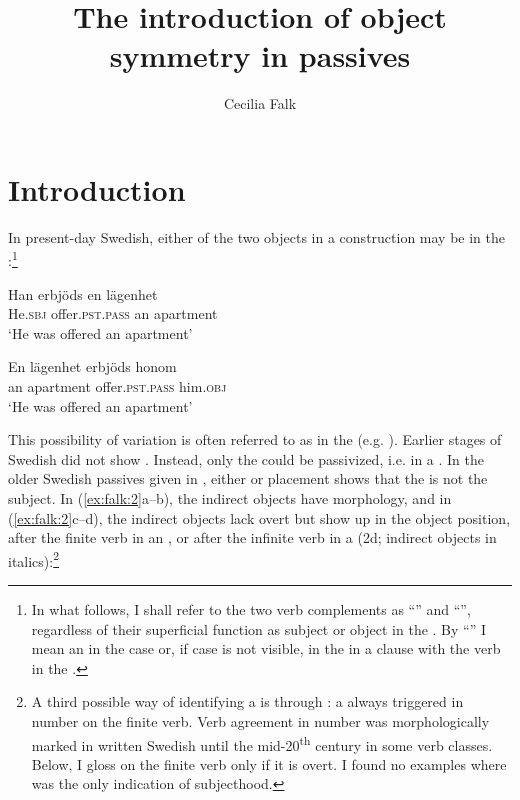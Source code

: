 \documentclass[output=paper]{langscibook}
\author{Cecilia Falk\affiliation{Stockholm University}}
\title{The introduction of object symmetry in passives}
\begin{document}
\maketitle


\section{Introduction}


In present-day Swedish, either of the two objects in a  construction may be  in the :\footnote{In what follows, I shall refer to the two verb complements as “” and “”, regardless of their superficial function as subject or object in the . By “” I mean an  in the  case or, if case is not visible, in the  in a clause with the verb in the .}

\ea%
    \label{ex:falk:1}
\ea
\gll Han    erbjöds      en  lägenhet\\
      He.\textsc{sbj}  offer.\textsc{pst}.\textsc{pass}  an  apartment\\
\glt ‘He was offered an apartment’

\ex
\gll En    lägenhet      erbjöds      honom\\
      an    apartment    offer.\textsc{pst}.\textsc{pass} him.\textsc{obj}\\
\glt ‘He was offered an apartment’
\z
\z


This possibility of variation is often referred to as  in the  (e.g. \citealt{Anagnostopoulou2003}). Earlier stages of Swedish did not show . Instead, only the  could be passivized, i.e.  in a . In the older Swedish passives given in , either  or placement shows that the  is not the subject. In (\ref{ex:falk:2}a–b), the indirect objects have  morphology, and in (\ref{ex:falk:2}c–d), the indirect objects lack overt  but show up in the object position, after the finite verb in an  , or after the infinite verb in a  (2d; indirect objects in italics):\footnote{A third possible way of identifying a  is through : a  always triggered  in number on the finite verb. Verb agreement in number was morphologically marked in written Swedish until the mid-20\textsuperscript{th} century in some verb classes. Below, I gloss  on the finite verb only if it is overt. I found no examples where  was the only indication of subjecthood.}
\end{document}
